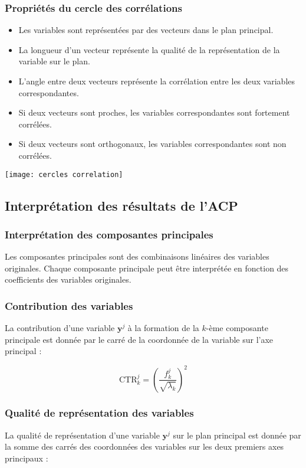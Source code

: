 \documentclass[10pt,a4paper]{article}
\begin{document}
\subsubsection*{Propriétés du cercle des corrélations}
\begin{itemize}
    \item Les variables sont représentées par des vecteurs dans le plan principal.
    \item La longueur d'un vecteur représente la qualité de la représentation de la variable sur le plan.
    \item L'angle entre deux vecteurs représente la corrélation entre les deux variables correspondantes.
    \item Si deux vecteurs sont proches, les variables correspondantes sont fortement corrélées.
    \item Si deux vecteurs sont orthogonaux, les variables correspondantes sont non corrélées.
\end{itemize}

\texttt{[image: cercles correlation]}

\subsection*{Interprétation des résultats de l'ACP}
\subsubsection*{Interprétation des composantes principales}
Les composantes principales sont des combinaisons linéaires des variables originales. Chaque composante principale peut être interprétée en fonction des coefficients des variables originales.

\subsubsection*{Contribution des variables}
La contribution d'une variable $\mathbf{y}^j$ à la formation de la $k$-ème composante principale est donnée par le carré de la coordonnée de la variable sur l'axe principal :

\[
\text{CTR}_k^j = \left( \frac{f_k^j}{\sqrt{\lambda_k}} \right)^2
\]

\subsubsection*{Qualité de représentation des variables}
La qualité de représentation d'une variable $\mathbf{y}^j$ sur le plan principal est donnée par la somme des carrés des coordonnées des variables sur les deux premiers axes principaux :
\end{document}
